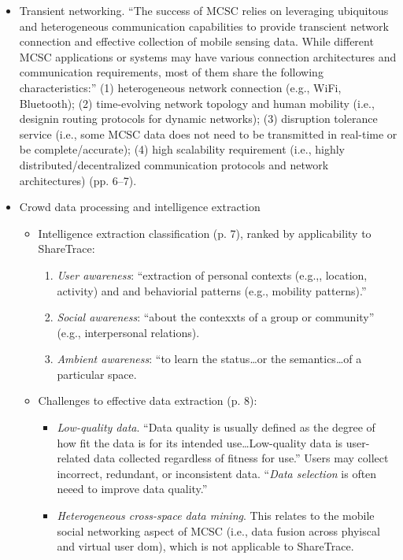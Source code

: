 \begin{itemize}
	\item Transient networking. ``The success of MCSC relies on leveraging ubiquitous and heterogeneous communication capabilities to provide transcient network connection and effective collection of mobile sensing data. While different MCSC applications or systems may have various connection architectures and communication requirements, most of them share the following characteristics:'' (1) heterogeneous network connection (e.g., WiFi, Bluetooth); (2) time-evolving network topology and human mobility (i.e., designin routing protocols for dynamic networks); (3) disruption tolerance service (i.e., some MCSC data does not need to be transmitted in real-time or be complete/accurate); (4) high scalability requirement (i.e., highly distributed/decentralized communication protocols and network architectures) (pp. 6--7).
	\item Crowd data processing and intelligence extraction
		\begin{itemize}
		\item Intelligence extraction classification (p. 7), ranked by applicability to ShareTrace:
			\begin{enumerate}
			\item \emph{User awareness}: ``extraction of personal contexts (e.g.,, location, activity) and and behaviorial patterns (e.g., mobility patterns).''
			\item \emph{Social awareness}: ``about the contexxts of a group or community'' (e.g., interpersonal relations).
			\item \emph{Ambient awareness}: ``to learn the status{\ldots}or the semantics{\ldots}of a particular space.
			\end{enumerate}
		\item Challenges to effective data extraction (p. 8):
			\begin{itemize}
			\item \emph{Low-quality data}. ``Data quality is usually defined as the degree of how fit the data is for its intended use{\ldots}Low-quality data is user-related data collected regardless of fitness for use.'' Users may collect incorrect, redundant, or inconsistent data. ``\emph{Data selection} is often neeed to improve data quality.''
			\item \emph{Heterogeneous cross-space data mining}. This relates to the mobile social networking aspect of MCSC (i.e., data fusion across phyiscal and virtual user dom), which is not applicable to ShareTrace.
			\end{itemize}

\end{itemize}
\end{itemize}
